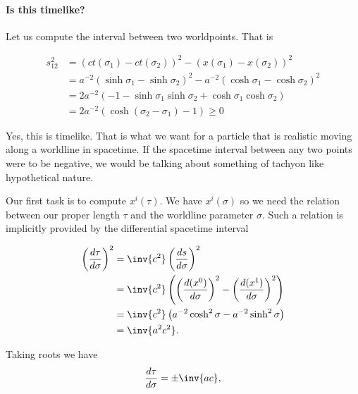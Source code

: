 {\paragraph{Is this timelike?}

Let us compute the interval between two worldpoints.  That is

\begin{equation}\label{eqn:relativisticElectrodynamicsT2:2100}
\begin{aligned}
s_{12}^2
&= (ct(\sigma_1) - ct(\sigma_2))^2 - (x(\sigma_1) - x(\sigma_2))^2  \\
&= a^{-2} (\sinh \sigma_1 - \sinh \sigma_2)^2 - a^{-2} (\cosh\sigma_1 - \cosh\sigma_2)^2 \\
&= 2 a^{-2} \left( -1 - \sinh\sigma_1 \sinh \sigma_2 + \cosh\sigma_1 \cosh\sigma_2 \right) \\
&= 2 a^{-2} \left( \cosh( \sigma_2 - \sigma_1) -1 \right) \ge 0
\end{aligned}
\end{equation}

Yes, this is timelike.  That is what we want for a particle that is realistic moving along a worldline in spacetime.  If the spacetime interval between any two points were to be negative, we would be talking about something of tachyon like hypothetical nature.



Our first task is to compute \(x^i(\tau)\).  We have \(x^i(\sigma)\) so we need the relation between our proper length \(\tau\) and the worldline parameter \(\sigma\).  Such a relation is implicitly provided by the differential spacetime interval

\begin{equation}\label{eqn:relativisticElectrodynamicsT2:2120}
\begin{aligned}
\left(\frac{d\tau}{d\sigma}\right)^2
&= \inv{c^2} \left(\frac{ds}{d\sigma}\right)^2 \\
&= \inv{c^2} \left(
\left( \frac{d(x^0)}{d\sigma}\right)^2
-\left( \frac{d(x^1)}{d\sigma}\right)^2
\right) \\
&= \inv{c^2} \left( a^{-2} \cosh^2 \sigma - a^{-2} \sinh^2 \sigma \right) \\
&= \inv{a^2 c^2}.
\end{aligned}
\end{equation}

Taking roots we have
\begin{equation}\label{eqn:relativisticElectrodynamicsT2:50}
\frac{d\tau}{d\sigma} = \pm \inv{a c},
\end{equation}

}
